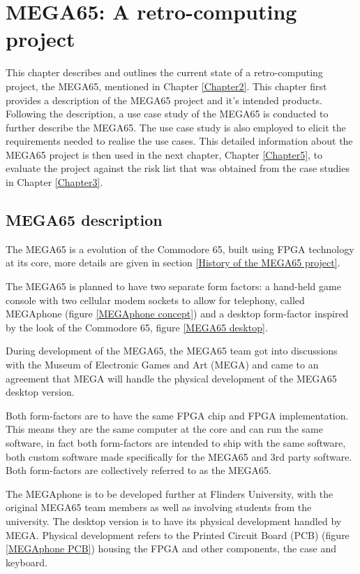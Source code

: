 
\chapter{MEGA65: A retro-computing project}
\label{Chapter4}

This chapter describes and outlines the current state of a retro-computing project, the MEGA65, mentioned in Chapter \ref{Chapter2}. This chapter first provides a description of the MEGA65 project and it's intended products. Following the description, a use case study of the MEGA65 is conducted to further describe the MEGA65. The use case study is also employed to elicit the requirements needed to realise the use cases. This detailed information about the MEGA65 project is then used in the next chapter, Chapter \ref{Chapter5}, to evaluate the project against the risk list that was obtained from the case studies in Chapter \ref{Chapter3}.
\section{MEGA65 description}
The MEGA65 is a evolution of the Commodore 65, built using FPGA technology at its core, more details are given in section \ref{History of the MEGA65 project}. 

The MEGA65 is planned to have two separate form factors: a hand-held game console with two cellular modem sockets to allow for telephony, called MEGAphone (figure \ref{MEGAphone concept}) and a desktop form-factor inspired by the look of the Commodore 65, figure \ref{MEGA65 desktop}. 

During development of the MEGA65, the MEGA65 team got into discussions with the Museum of Electronic Games and Art (MEGA) and came to an agreement that MEGA will handle the physical development of the MEGA65 desktop version.

Both form-factors are to have the same FPGA chip and FPGA implementation. This means they are the same computer at the core and can run the same software, in fact both form-factors are intended to ship with the same software, both custom software made specifically for the MEGA65 and 3rd party software. Both form-factors are collectively referred to as the MEGA65. 

The MEGAphone is to be developed further at Flinders University, with the original MEGA65 team members as well as involving students from the university. The desktop version is to have its physical development handled by MEGA. Physical development refers to the Printed Circuit Board (PCB) (figure \ref{MEGAphone PCB}) housing the FPGA and other components, the case and keyboard. 

